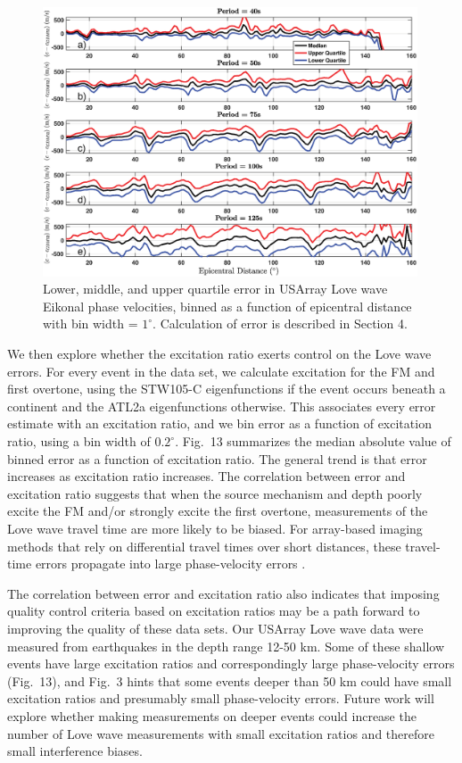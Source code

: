 \documentclass[extra,mreferee]{gji}
\begin{document}
    \begin{figure}
 \includegraphics[width=0.99\textwidth]{Fig12.eps}
 \caption{Lower, middle, and upper quartile error in USArray Love wave Eikonal phase velocities, binned as a function of epicentral distance with bin width = $1^\circ$. Calculation of error is described in Section 4.}
\end{figure}

We then explore whether the excitation ratio exerts control on the Love wave errors. For every event in the data set, we calculate excitation for the FM and first overtone, using the STW105-C eigenfunctions if the event occurs beneath a continent and the ATL2a eigenfunctions otherwise. This associates every error estimate with an excitation ratio, and we bin error as a function of excitation ratio, using a bin width of $0.2^\circ$. Fig.\ 13 summarizes the median absolute value of binned error as a function of excitation ratio. The general trend is that error increases as excitation ratio increases. The correlation between error and excitation ratio suggests that when the source mechanism and depth poorly excite the FM and/or strongly excite the first overtone, measurements of the Love wave travel time are more likely to be biased. For array-based imaging methods that rely on differential travel times over short distances, these travel-time errors propagate into large phase-velocity errors \citep{foster2014overtone}. 

The correlation between error and excitation ratio also indicates that imposing quality control criteria based on excitation ratios may be a path forward to improving the quality of these data sets. Our USArray Love wave data were measured from earthquakes in the depth range 12-50 km. Some of these shallow events have large excitation ratios and correspondingly large phase-velocity errors (Fig.\ 13), and Fig.\ 3 hints that some events deeper than 50 km could have small excitation ratios and presumably small phase-velocity errors. Future work will explore whether making measurements on deeper events could increase the number of Love wave measurements with small excitation ratios and therefore small interference biases.
\end{document}
